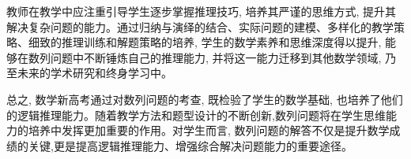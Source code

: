 \documentclass[10pt]{article}
\begin{document}
教师在教学中应注重引导学生逐步掌握推理技巧, 培养其严谨的思维方式, 提升其解决复杂问题的能力。通过归纳与演绎的结合、实际问题的建模、多样化的教学策略、细致的推理训练和解题策略的培养, 学生的数学素养和思维深度得以提升, 能够在数列问题中不断锤炼自己的推理能力, 并将这一能力迁移到其他数学领域, 乃至未来的学术研究和终身学习中。

总之, 数学新高考通过对数列问题的考查, 既检验了学生的数学基础, 也培养了他们的逻辑推理能力。随着教学方法和题型设计的不断创新,数列问题将在学生思维能力的培养中发挥更加重要的作用。对学生而言, 数列问题的解答不仅是提升数学成绩的关键,更是提高逻辑推理能力、增强综合解决问题能力的重要途径。
\end{document}
